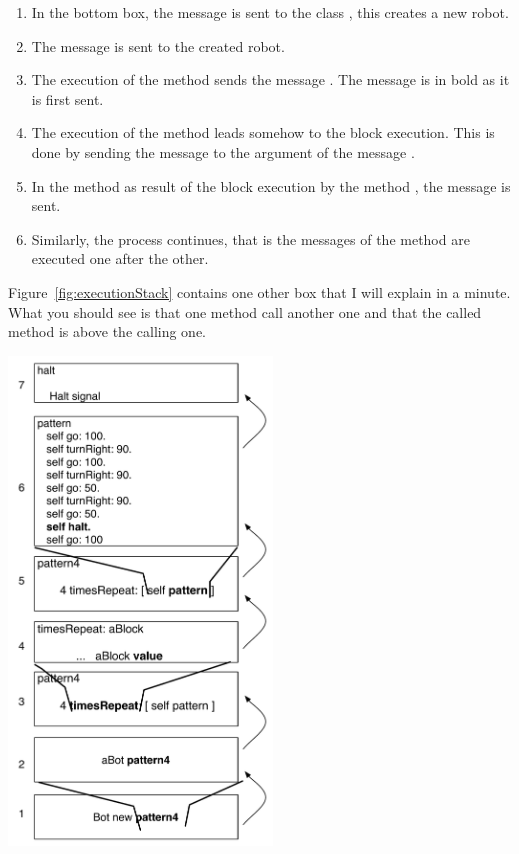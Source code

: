 \begin{minipage}[c]{8cm}
\begin{enumerate}
\item In the bottom box, the message  is sent to the class , this creates a new robot. 
\item The message  is sent to the created robot.
\item The execution of the method  sends the message . The message  is in bold as it is first sent.
\item The execution of the method  leads somehow to the block execution. This is done by sending the message  to the argument of the message .
\item In the method  as result of the block execution by the method , the message  is sent. 
\item Similarly, the process continues, that is the messages of the method 
are executed one after the other. 
\end{enumerate}
Figure~\ref{fig:executionStack} contains one other box that I will explain in a minute.
What you should see is that one method call another one and that the called method is above the calling one. 
\end{minipage}
\begin{minipage}[c]{8cm}
\includegraphics[width=7cm]{executionStack}
\end{minipage}

